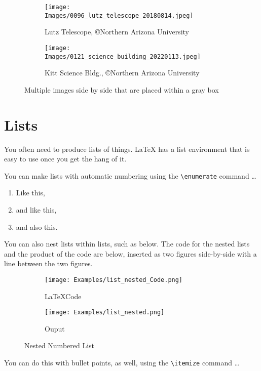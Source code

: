 \documentclass[10pt]{article}
\begin{document}
\begin{tcolorbox}[colframe=black, boxrule=0.5pt, sharp corners, enhanced]
\begin{figure}[H]
\centering
\begin{subfigure}{0.48\textwidth}
  \centering
  \texttt{[image: Images/0096\_lutz\_telescope\_20180814.jpeg]}
  \caption{Lutz Telescope, \copyright Northern Arizona University}
  \label{fig:lutz2}
\end{subfigure}
\hfill
\begin{subfigure}{0.48\textwidth}
  \centering
  \texttt{[image: Images/0121\_science\_building\_20220113.jpeg]}
  \caption{Kitt Science Bldg., \copyright Northern Arizona University}
  \label{fig:kittbldg2}
\end{subfigure}
\caption{Multiple images side by side that are placed within a gray box}
\label{fig:box}
\end{figure}
\end{tcolorbox}

\newpage
\section*{Lists}
You often need to produce lists of things. \LaTeX{} has a list environment that is easy to use once you get the hang of it. 

You can make lists with automatic numbering using the \verb|\enumerate| command \dots

\begin{enumerate}
\item Like this,
\item and like this,
\item and also this.
\end{enumerate}

You can also nest lists within lists, such as below. The code for the nested lists and the product of the code are below, inserted as two figures side-by-side with a line between the two figures.

\begin{figure}[ht]
\centering

\begin{subfigure}[t]{0.3\textwidth}
  \raggedright
  \texttt{[image: Examples/list\_nested\_Code.png]}
  \caption{\LaTeX Code}
  \label{fig:list_ex1.1}
\end{subfigure}
\vrule width 1pt
\begin{subfigure}[t]{0.3\textwidth}
  \raggedleft
  \texttt{[image: Examples/list\_nested.png]}
  \caption{Ouput}
  \label{fig:list_ex1.2}
\end{subfigure}

\caption{Nested Numbered List}
\label{fig:list_ex1}
\end{figure}
\vspace{1cm}
You can do this with bullet points, as well, using the \verb|\itemize| command \dots 
\end{document}
